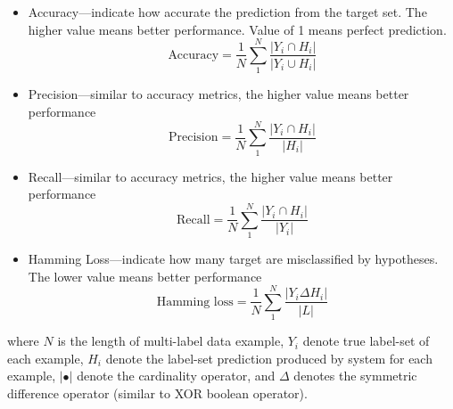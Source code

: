 \documentclass{article}
\begin{document}
\begin{itemize}
\item Accuracy---indicate how accurate the prediction from the target set. The higher value means better performance. Value of 1 means perfect prediction.
\begin{equation}
\label{eq:accu}
\mbox{Accuracy} = \frac{1}{N} \sum_{1}^{N} \frac{|Y_i \cap H_i|}{|Y_i \cup H_i|}
\end{equation}

\item Precision---similar to accuracy metrics, the higher value means better performance
\begin{equation}
\label{eq:prec}
\mbox{Precision} = \frac{1}{N} \sum_{1}^{N} \frac{|Y_i \cap H_i|}{|H_i|}
\end{equation}

\item Recall---similar to accuracy metrics, the higher value means better performance
\begin{equation}
\label{eq:reca}
\mbox{Recall} = \frac{1}{N} \sum_{1}^{N} \frac{|Y_i \cap H_i|}{|Y_i|}
\end{equation}

\item Hamming Loss---indicate how many target are misclassified by hypotheses. The lower value means better performance
\begin{equation}
\label{eq:hlos}
\mbox{Hamming loss} = \frac{1}{N} \sum_{1}^{N} \frac{|Y_i \Delta H_i|}{|L|}
\end{equation}
\end{itemize}

\noindent where $N$ is the length of multi-label data example, $Y_i$ denote true label-set of each example, $H_i$ denote the label-set prediction produced by system for each example, $|\bullet|$ denote the cardinality operator, and $\Delta$ denotes the symmetric difference operator (similar to XOR boolean operator).

\end{document}
